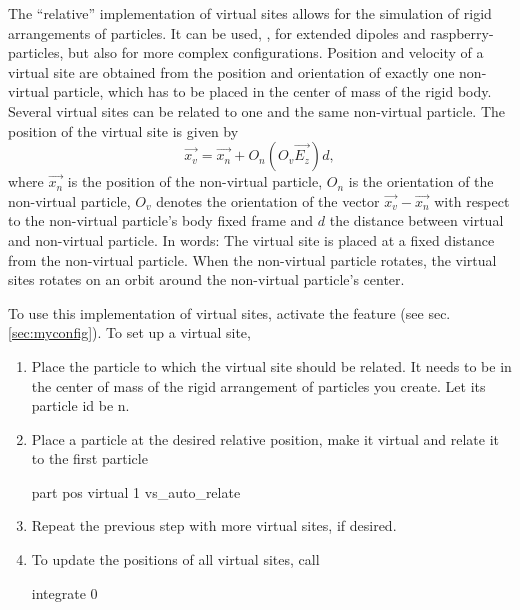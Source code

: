The ``relative'' implementation of virtual sites allows for the
simulation of rigid arrangements of particles. It can be used, \eg,
for extended dipoles and raspberry-particles, but also for more
complex configurations.  Position and velocity of a virtual site are
obtained from the position and orientation of exactly one non-virtual
particle, which has to be placed in the center of mass of the rigid
body. Several virtual sites can be related to one and the same
non-virtual particle.  The position of the virtual site is given by
\begin{equation}
\vec{x_v} =\vec{x_n} +O_n (O_v \vec{E_z}) d,
\end{equation}
where $\vec{x_n}$ is the position of the non-virtual particle, $O_n$
is the orientation of the non-virtual particle, $O_v$ denotes the
orientation of the vector $\vec{x_v}-\vec{x_n}$ with respect to the
non-virtual particle's body fixed frame and $d$ the distance between
virtual and non-virtual particle.  In words: The virtual site is
placed at a fixed distance from the non-virtual particle. When the
non-virtual particle rotates, the virtual sites rotates on an orbit
around the non-virtual particle's center.

To use this implementation of virtual sites, activate the feature
 (see sec. \ref{sec:myconfig}).  To
set up a virtual site,
\begin{enumerate}
\item Place the particle to which the virtual site should be
  related. It needs to be in the center of mass of the rigid
  arrangement of particles you create. Let its particle id be n.
\item Place a particle at the desired relative position, make it
  virtual and relate it to the first particle
  \begin{essyntaxbox}
    part  pos  virtual 1 vs_auto_relate 
  \end{essyntaxbox}
\item Repeat the previous step with more virtual sites, if desired.
\item To update the positions of all virtual sites, call
  \begin{essyntaxbox}
    integrate 0
  \end{essyntaxbox}
\end{enumerate}

